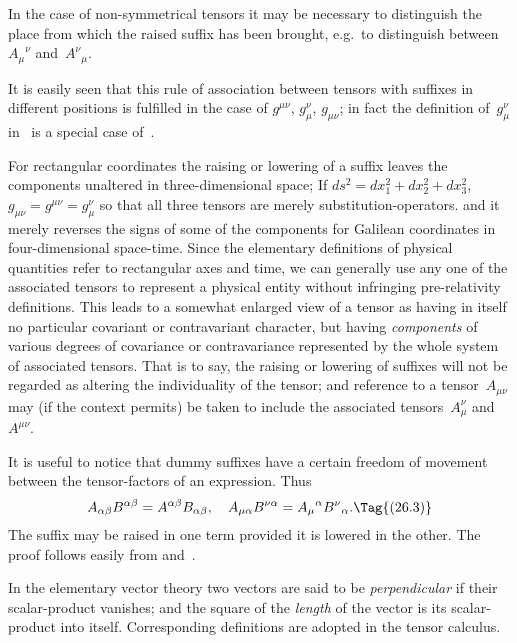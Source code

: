 \documentclass[12pt]{book}
\begin{document}
In the case of non-symmetrical tensors it may be necessary to distinguish
the place from which the raised suffix has been brought, e.g.\ to distinguish
between ${A_{\mu}}^{\nu}$ and~${A^{\nu}}_{\mu}$.

It is easily seen that this rule of association between tensors with suffixes
in different positions is fulfilled in the case of $g^{\mu\nu}$, $g_{\mu}^{\nu}$, $g_{\mu\nu}$; in fact the definition
of~$g_{\mu}^{\nu}$ in~ is a special case of~.

For rectangular coordinates the raising or lowering of a suffix leaves the
components unaltered in three-dimensional space\footnotemark;\footnotetext
  {If $ds^{2} = dx_{1}^{2} + dx_{2}^{2} + dx_{3}^{2}$, $g_{\mu\nu} = g^{\mu\nu} = g_{\mu}^{\nu}$ so that all three tensors are merely substitution-operators.}
and it merely reverses
%
the signs of some of the components for Galilean coordinates in four-dimensional
space-time. Since the elementary definitions of physical
quantities refer to rectangular axes and time, we can generally use any one
of the associated tensors to represent a physical entity without infringing
pre-relativity definitions. This leads to a somewhat enlarged view of a tensor
as having in itself no particular covariant or contravariant character, but
having \emph{components} of various degrees of covariance or contravariance represented
by the whole system of associated tensors. That is to say, the raising
or lowering of suffixes will not be regarded as altering the individuality of
the tensor; and reference to a tensor~$A_{\mu\nu}$ may (if the context permits) be
taken to include the associated tensors~$A_{\mu}^{\nu}$ and~$A^{\mu\nu}$.

It is useful to notice that dummy suffixes have a certain freedom of movement
between the tensor-factors of an expression. Thus
\[
A_{\alpha\beta} B^{\alpha\beta} = A^{\alpha\beta} B_{\alpha\beta},\quad
A_{\mu\alpha} B^{\nu\alpha} = {A_{\mu}}^{\alpha} {B^{\nu}}_{\alpha}.
\Tag{(26.3)}
\]
The suffix may be raised in one term provided it is lowered in the other.
The proof follows easily from  and~.

In the elementary vector theory two vectors are said to be \emph{perpendicular}
%
%
%
if their scalar-product vanishes; and the square of the \emph{length} of the vector is
its scalar-product into itself. Corresponding definitions are adopted in the
tensor calculus.
\end{document}
